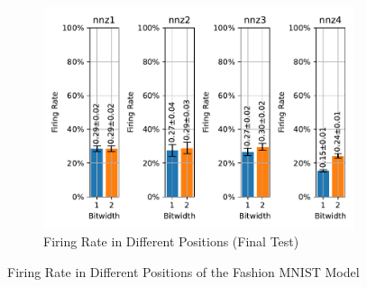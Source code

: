         \begin{figure}[H]
            \centering
            \ContinuedFloat
            \begin{subfigure}[H]{\textwidth}
                \centering
                \includegraphics[width=\textwidth]{../firerate/FashionMNIST/plots/fashionmnist_final_firerate.pdf}
                \caption{Firing Rate in Different Positions (Final Test)}
            \end{subfigure}
            \caption{Firing Rate in Different Positions of the Fashion MNIST Model}
        \end{figure}

